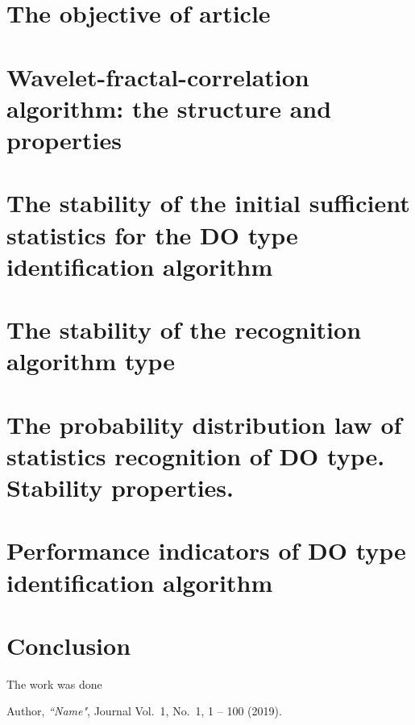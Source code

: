 \documentclass[
11pt,%
tightenlines,%
twoside,%
onecolumn,%
nofloats,%
nobibnotes,%
nofootinbib,%
superscriptaddress,%
noshowpacs,%
centertags]%
{revtex4}
\begin{document}


\section{The objective of article}



\section{Wavelet-fractal-correlation algorithm: the structure and properties}



\section{The stability of the initial sufficient statistics for the DO type identification algorithm}



\section{The stability of the recognition algorithm type}



\section{The probability distribution law of statistics recognition of DO type. Stability properties.}



\section{Performance indicators of DO type identification algorithm}



\section{Conclusion}



\begin{acknowledgments}
The work was done
\end{acknowledgments}

\begin{thebibliography}{99}

Author, {\it ``Name"}, Journal Vol.~1, No.~1, 1 -- 100 (2019).

\end{thebibliography}
\end{document}
